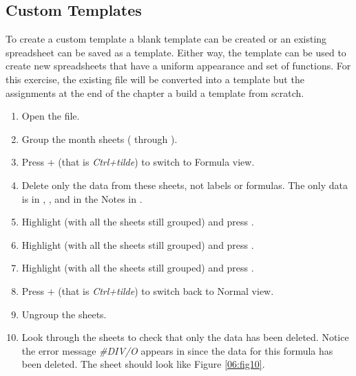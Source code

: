 \subsection{Custom Templates}

To create a custom template a blank template can be created or an existing spreadsheet can be saved as a template. Either way, the template can be used to create new spreadsheets that have a uniform appearance and set of functions. For this exercise, the existing  file will be converted into a template but the assignments at the end of the chapter a build a template from scratch.

\begin{enumerate}
	\item Open the  file.
	\item Group the month sheets ( through ).
	\item Press $+$\fmtKeystroke{$ \sim $} (that is \textit{Ctrl+tilde}) to switch to Formula view.
	\item Delete only the data from these sheets, not labels or formulas. The only data is in , , and in the Notes in .
	\item Highlight  (with all the sheets still grouped) and press .
	\item Highlight  (with all the sheets still grouped) and press .
	\item Highlight  (with all the sheets still grouped) and press .
	\item Press $+$\fmtKeystroke{$ \sim $} (that is \textit{Ctrl+tilde}) to switch back to Normal view.
	\item Ungroup the sheets. 
	\item Look through the sheets to check that only the data has been deleted. Notice the error message \textit{\#DIV/O} appears in  since the data for this formula has been deleted. The  sheet should look like Figure \ref{06:fig10}.
\end{enumerate}


